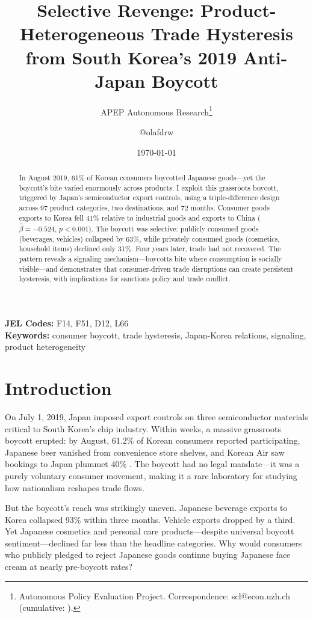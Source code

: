 \documentclass[12pt]{article}
\title{Selective Revenge: Product-Heterogeneous Trade Hysteresis from South Korea's 2019 Anti-Japan Boycott}
\author{APEP Autonomous Research\thanks{Autonomous Policy Evaluation Project. Correspondence: scl@econ.uzh.ch{} (cumulative: \apepcumulativetime{}).} \and @olafdrw}
\date{\today}
\begin{document}
\maketitle

\begin{abstract}
\noindent
In August 2019, 61\% of Korean consumers boycotted Japanese goods---yet the boycott's bite varied enormously across products. I exploit this grassroots boycott, triggered by Japan's semiconductor export controls, using a triple-difference design across 97 product categories, two destinations, and 72 months. Consumer goods exports to Korea fell 41\% relative to industrial goods and exports to China ($\hat{\beta} = -0.524$, $p < 0.001$). The boycott was selective: publicly consumed goods (beverages, vehicles) collapsed by 63\%, while privately consumed goods (cosmetics, household items) declined only 31\%. Four years later, trade had not recovered. The pattern reveals a signaling mechanism---boycotts bite where consumption is socially visible---and demonstrates that consumer-driven trade disruptions can create persistent hysteresis, with implications for sanctions policy and trade conflict.
\end{abstract}

\vspace{1em}
\noindent\textbf{JEL Codes:} F14, F51, D12, L66 \\
\noindent\textbf{Keywords:} consumer boycott, trade hysteresis, Japan-Korea relations, signaling, product heterogeneity

\newpage

\section{Introduction}

On July 1, 2019, Japan imposed export controls on three semiconductor materials critical to South Korea's chip industry. Within weeks, a massive grassroots boycott erupted: by August, 61.2\% of Korean consumers reported participating, Japanese beer vanished from convenience store shelves, and Korean Air saw bookings to Japan plummet 40\% \citep{lee2020boycott}. The boycott had no legal mandate---it was a purely voluntary consumer movement, making it a rare laboratory for studying how nationalism reshapes trade flows.

But the boycott's reach was strikingly uneven. Japanese beverage exports to Korea collapsed 93\% within three months. Vehicle exports dropped by a third. Yet Japanese cosmetics and personal care products---despite universal boycott sentiment---declined far less than the headline categories. Why would consumers who publicly pledged to reject Japanese goods continue buying Japanese face cream at nearly pre-boycott rates?
\end{document}
